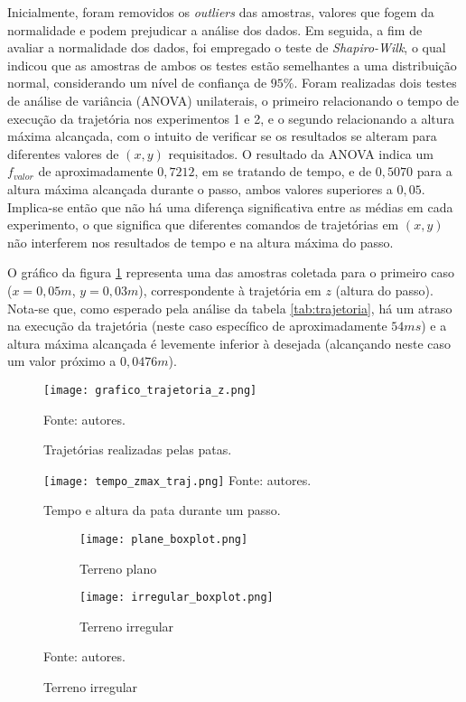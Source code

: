 \documentclass[../main.tex]{subfiles}
\begin{document}
  Inicialmente, foram removidos os \textit{outliers} das amostras, valores que fogem da normalidade e podem prejudicar a análise dos dados. Em seguida, a fim de avaliar a normalidade dos dados, foi empregado o teste de \textit{Shapiro-Wilk}, o qual indicou que as amostras de ambos os testes estão semelhantes a uma distribuição normal, considerando um nível de confiança de $95\%$.  Foram realizadas dois testes de análise de variância (ANOVA) unilaterais, o primeiro relacionando o tempo de execução da trajetória nos experimentos 1 e 2, e o segundo relacionando a altura máxima alcançada, com o intuito de verificar se os resultados se alteram para diferentes valores de $(x, y)$ requisitados. O resultado da ANOVA indica um $f_{valor}$ de aproximadamente $0,7212$, em se tratando de tempo, e de $0,5070$ para a altura máxima alcançada durante o passo, ambos valores superiores a $0,05$. Implica-se então que não há uma diferença significativa entre as médias em cada experimento, o que significa que diferentes comandos de trajetórias em $(x, y)$ não interferem nos resultados de tempo e na altura máxima do passo.

  O gráfico da figura \ref{fig:grafico_trajetoria_xyz} representa uma das amostras coletada para o primeiro caso ($x=0,05m$, $y=0,03m$), correspondente à trajetória em $z$ (altura do passo). Nota-se que, como esperado pela análise da tabela \ref{tab:trajetoria}, há um atraso na execução da trajetória (neste caso específico de aproximadamente $54ms$) e a altura máxima alcançada é levemente inferior à desejada (alcançando neste caso um valor próximo a $0,0476m$).

  \begin{figure}[!htb]
    \centering
    \caption{Trajetórias realizadas pelas patas.}
    \texttt{[image: grafico\_trajetoria\_z.png]}
  
    Fonte: autores.
    \label{fig:grafico_trajetoria_xyz}
  \end{figure}

  \begin{figure}
    \centering
    \caption{Tempo e altura da pata durante um passo.}
    \texttt{[image: tempo\_zmax\_traj.png]}
    Fonte: autores.
    \label{fig:time_zmax_traj}
  \end{figure}

  \begin{figure}[!htb]
    \centering
    \caption{Oscilação do corpo em ambos os tipos de terreno.}
    \begin{subfigure}[t]{0.49\textwidth}
      \centering
      \texttt{[image: plane\_boxplot.png]}
      \caption{Terreno plano}
      \label{fig:imu_test_plane}
    \end{subfigure}
    \begin{subfigure}[t]{0.49\textwidth}
      \centering
      \texttt{[image: irregular\_boxplot.png]}
      \caption{Terreno irregular}
      \label{fig:imu_test_irregular}
    \end{subfigure}
    
    Fonte: autores.
    \label{fig:imu_test}
  \end{figure}
\end{document}

